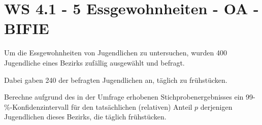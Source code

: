 \section{WS 4.1 - 5 Essgewohnheiten - OA - BIFIE}

\begin{beispiel}[WS 4.1]{1} %
				Um die Essgewohnheiten von Jugendlichen zu untersuchen, wurden 400 Jugendliche eines Bezirks zufällig ausgewählt und befragt.

Dabei gaben 240 der befragten Jugendlichen an, täglich zu frühstücken.

Berechne aufgrund des in der Umfrage erhobenen Stichprobenergebnisses ein 99-\%-Konfidenzintervall für den tatsächlichen (relativen) Anteil $p$ derjenigen Jugendlichen dieses Bezirks, die täglich frühstücken.\\

\end{beispiel}	